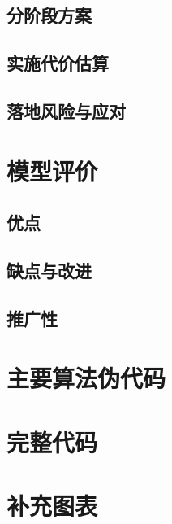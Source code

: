 \documentclass[12pt,a4paper]{ctexart}
\begin{document}
\subsection{分阶段方案}

\subsection{实施代价估算}

\subsection{落地风险与应对}

\section{模型评价}

\subsection{优点}

\subsection{缺点与改进}

\subsection{推广性}




\appendix

\section{主要算法伪代码}

\section{完整代码}


\section{补充图表}
\end{document}
